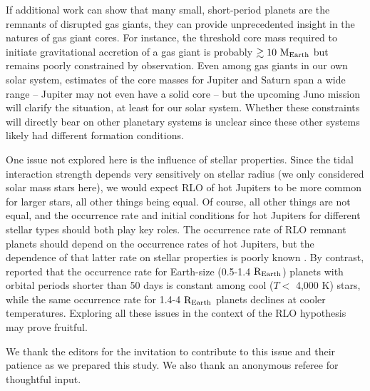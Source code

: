 \documentclass{svjour3}                     %
\begin{document}
If additional work can show that many small, short-period planets are the remnants of disrupted gas giants, they can provide unprecedented insight in the natures of gas giant cores. For instance, the threshold core mass required to initiate gravitational accretion of a gas giant is probably $\gtrsim 10\ {\rm M_{Earth}}$ \cite{2014A&A...572A.107L} but remains poorly constrained by observation. Even among gas giants in our own solar system, estimates of the core masses for Jupiter and Saturn span a wide range -- Jupiter may not even have a solid core \cite{2010SSRv..152..423F} -- but the upcoming Juno mission will clarify the situation, at least for our solar system. Whether these constraints will directly bear on other planetary systems is unclear since these other systems likely had different formation conditions. 

One issue not explored here is the influence of stellar properties. Since the tidal interaction strength depends very sensitively on stellar radius (we only considered solar mass stars here), we would expect RLO of hot Jupiters to be more common for larger stars, all other things being equal. Of course, all other things are not equal, and the occurrence rate and initial conditions for hot Jupiters for different stellar types should both play key roles. The occurrence rate of RLO remnant planets should depend on the occurrence rates of hot Jupiters, but the dependence of that latter rate on stellar properties is poorly known \cite{2015ApJ...799..229W}. By contrast, \cite{2013ApJ...767...95D} reported that the occurrence rate for Earth-size (0.5-1.4 ${\rm R_{Earth}}$) planets with orbital periods shorter than 50 days is constant among cool ($T <$ 4,000 K) stars, while the same occurrence rate for 1.4-4 ${\rm R_{Earth}}$ planets declines at cooler temperatures. Exploring all these issues in the context of the RLO hypothesis may prove fruitful.

\begin{acknowledgements}
We thank the editors for the invitation to contribute to this issue and their patience as we prepared this study. We also thank an anonymous referee for thoughtful input.
\end{acknowledgements}


%
%
\end{document}
